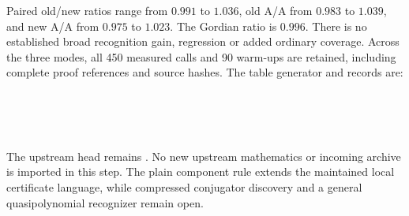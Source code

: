 Paired old/new ratios range from $0.991$ to $1.036$, old A/A from $0.983$ to
$1.039$, and new A/A from $0.975$ to $1.023$. The Gordian ratio is $0.996$.
There is no established broad recognition gain, regression or added ordinary
coverage. Across the three modes, all 450 measured calls and 90 warm-ups are
retained, including complete proof references and source hashes. The table
generator and records are:
\begin{flushleft}\small
{}\\
\\
\\
\end{flushleft}
The upstream  head remains . No new
upstream mathematics or incoming archive is imported in this step. The plain
component rule extends the maintained local certificate language, while
compressed conjugator discovery and a general quasipolynomial recognizer
remain open.
